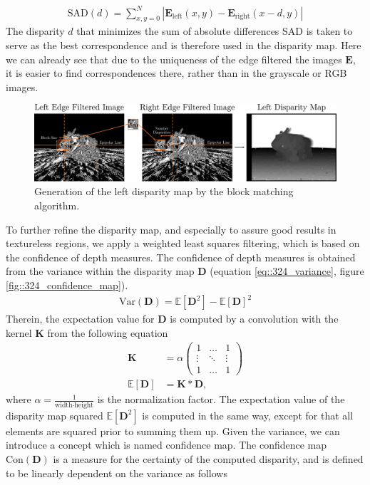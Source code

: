 \begin{align}
	\text{SAD}(d) = \sum_{x,y=0}^N |\bm{E}_\text{left}(x,y) - \bm{E}_\text{right}(x-d,y)|
	\label{eq::324_sad}
\end{align}
The disparity $d$ that minimizes the sum of absolute differences SAD is taken to serve as the best correspondence and is therefore used in the disparity map.  Here we can already see that due to the uniqueness of the edge filtered the images $\bm{E}$, it is easier to find correspondences there, rather than in the grayscale or RGB images.
\begin{figure}[h]
	\centering
	\includegraphics[scale=.28]{chapters/03_background/img/left_disparity_map.png}
	\caption{Generation of the left disparity map by the block matching algorithm.}
	\label{fig::324_left_disparity_map}
\end{figure}
To further refine the disparity map, and especially to assure good results in textureless  regions, we apply a weighted least squares filtering, which is based on the confidence of depth measures. The confidence of depth measures is obtained from the variance within the disparity map $\bm{D}$ (equation \ref{eq::324_variance}, figure \ref{fig::324_confidence_map}).
\begin{align}
	 \text{Var}(\bm{D}) = \mathbb{E}\left[\bm{D}^2\right] - \mathbb{E}\left[\bm{D}\right]^2
	\label{eq::324_variance}
\end{align} 
Therein, the expectation value for $\bm{D}$ is computed by a convolution with the kernel $\bm{K}$ from the following equation
\begin{align}
	\bm{K} &= \alpha
	\begin{pmatrix}
	1 & \dots & 1 \\
	\vdots & \ddots & \vdots \\
	1 & \dots & 1
	\end{pmatrix} \\
	\mathbb{E}\left[\bm{D}\right] &= \bm{K}*\bm{D},
	\label{eq::324_kernel}
\end{align}
where $\alpha = \frac{1}{\text{width}\cdot\text{height}}$ is the normalization factor. The expectation value of the disparity map squared $\mathbb{E}\left[\bm{D}^2\right]$ is computed in the same way, except for that all elements are squared prior to summing them up. Given the variance, we can introduce a concept which is named confidence map. The confidence map $\text{Con}(\bm{D})$ is a measure for the certainty of the computed disparity, and is defined to be linearly dependent on the variance as follows
